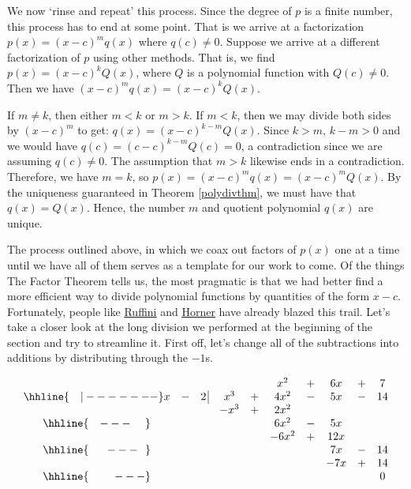 \documentclass{ximera}
\begin{document}
\medskip

We now `rinse and repeat' this process.  Since the degree of $p$ is a finite number, this process has to end at some point.  That is we arrive at a factorization  $p(x) = (x-c)^m q(x)$ where $q(c) \neq 0$.  Suppose we arrive at a different factorization of $p$ using other methods.  That is, we find $p(x) = (x-c)^k Q(x)$, where $Q$ is a polynomial function with $Q(c) \neq 0$.   Then we have $(x-c)^m q(x) = (x-c)^k Q(x)$.    

\medskip

If $m \neq k$, then either $m<k$ or $m>k$.  If $m<k$, then we may divide both sides by $(x-c)^{m}$ to get: $q(x) = (x-c)^{k-m} Q(x)$.  Since $k>m$, $k-m>0$ and we would have $q(c) = (c-c)^{k-m} Q(c) = 0$, a contradiction since we are assuming $q(c) \neq 0$.   The assumption that $m>k$ likewise ends in a contradiction.   Therefore, we have $m = k$, so $p(x) = (x-c)^m q(x) = (x-c)^m Q(x)$.  By the uniqueness guaranteed in Theorem \ref{polydivthm}, we must have that $q(x) = Q(x)$.  Hence, the number $m$ and quotient polynomial $q(x)$ are unique. 

\medskip

The process outlined above, in which we coax out factors of $p(x)$ one at a time until we have all of them serves as a template for our work to come. Of the things The Factor Theorem tells us, the most pragmatic is that we had better find a more efficient way to divide polynomial functions by quantities of the form $x-c$.  Fortunately, people like \href{http://en.wikipedia.org/wiki/Synthetic_division}{\underline{Ruffini}} and \href{http://en.wikipedia.org/wiki/Horner_scheme}{\underline{Horner}} have already blazed this trail.  Let's take a closer look at the long division we performed at the beginning of the section and try to streamline it.  First off, let's change all of the subtractions into additions by distributing through the $-1$s.


\setlength\arraycolsep{0.1pt}
\setlength\extrarowheight{2pt}

\[ \begin{array}{cccccccccc}

& & & & & x^2 & + & 6x & + & 7 \\ \hhline{~~~|-------}

x & - & 2 \, \vline& x^3 & + & 4x^2 & - & 5x & - & 14 \\

 &  &  &  -x^3  & + &   2x^2 &  &  &  &  \\ \hhline{~~~---~~~~} 
 &  &  &   &  & 6 x^2 & - & 5x &  &  \\ 
 &  &  &   & &-6 x^2  & + &  12x &  &  \\ \hhline{~~~~~---~~} 
 &  &  &   &   &  & & 7x  & - & 14 \\
 &  &  &   &   &  & & - 7x  & + &  14  \\ \hhline{~~~~~~~---} 
 &   &  &  &  &  &  &  &  & 0
 
\end{array}\]
\end{document}
